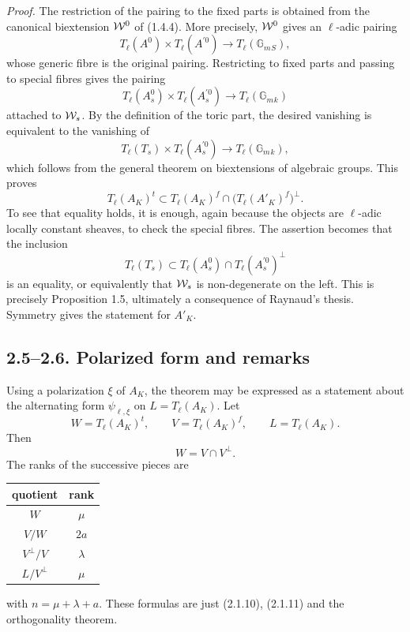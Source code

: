 \documentclass[11pt]{article}
\providecommand{\Gm}{\mathbb G_m}
\begin{document}
\emph{Proof.}  The restriction of the pairing to the fixed parts is obtained from the canonical biextension \(\mathcal W^0\) of (1.4.4).  More precisely, \(\mathcal W^0\) gives an \(\ell\)-adic pairing
\begin{equation}\tag{2.4.1}
 T_\ell(A^0)\times T_\ell(A^{\prime 0})\longrightarrow T_\ell(\Gm{}_S),
\end{equation}
whose generic fibre is the original pairing.  Restricting to fixed parts and passing to special fibres gives the pairing
\begin{equation}\tag{2.4.3}
 T_\ell(A_s^0)\times T_\ell(A_s^{\prime 0})\longrightarrow T_\ell(\Gm{}_k)
\end{equation}
attached to \(\mathcal W_s\).  By the definition of the toric part, the desired vanishing is equivalent to the vanishing of
\begin{equation}\tag{2.4.5}
 T_\ell(T_s)\times T_\ell(A_s^{\prime 0})\longrightarrow T_\ell(\Gm{}_k),
\end{equation}
which follows from the general theorem on biextensions of algebraic groups.  This proves
\begin{equation}\tag{2.4.6}
 T_\ell(A_K)^t\subset T_\ell(A_K)^f\cap\bigl(T_\ell(A'_K)^f\bigr)^\perp.
\end{equation}
To see that equality holds, it is enough, again because the objects are \(\ell\)-adic locally constant sheaves, to check the special fibres.  The assertion becomes that the inclusion
\begin{equation}\tag{2.4.7}
 T_\ell(T_s)\subset T_\ell(A_s^0)\cap T_\ell(A_s^{\prime 0})^\perp
\end{equation}
is an equality, or equivalently that \(\mathcal W_s\) is non-degenerate on the left.  This is precisely Proposition 1.5, ultimately a consequence of Raynaud's thesis.  Symmetry gives the statement for \(A'_K\).

\subsection*{2.5--2.6. Polarized form and remarks}
Using a polarization \(\xi\) of \(A_K\), the theorem may be expressed as a statement about the alternating form \(\psi_{\ell,\xi}\) on
\(L=T_\ell(A_K)\).  Let
\begin{equation}\tag{2.5.2}
 W=T_\ell(A_K)^t,
 \qquad
 V=T_\ell(A_K)^f,
 \qquad
 L=T_\ell(A_K).
\end{equation}
Then
\begin{equation}\tag{2.5.3}
 W=V\cap V^\perp.
\end{equation}
The ranks of the successive pieces are
\begin{center}
\begin{tabular}{c|c}
quotient & rank \\
\hline
\(W\) & \(\mu\) \\
\(V/W\) & \(2a\) \\
\(V^\perp/V\) & \(\lambda\) \\
\(L/V^\perp\) & \(\mu\)
\end{tabular}
\end{center}
with \(n=\mu+\lambda+a\).  These formulas are just (2.1.10), (2.1.11) and the orthogonality theorem.
\end{document}
